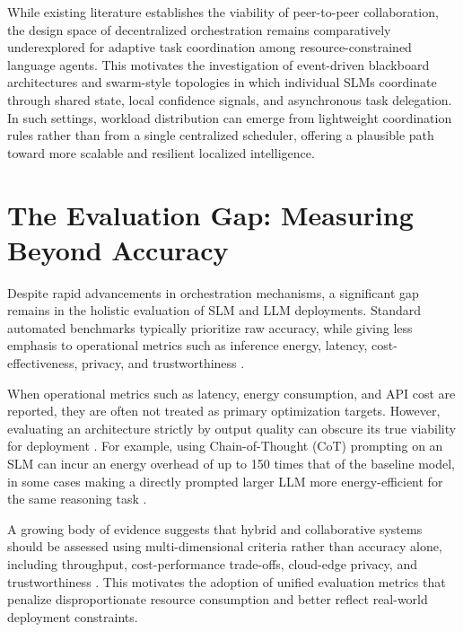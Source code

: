 While existing literature establishes the viability of peer-to-peer collaboration, the design space of decentralized orchestration remains comparatively underexplored for adaptive task coordination among resource-constrained language agents. This motivates the investigation of event-driven blackboard architectures and swarm-style topologies in which individual SLMs coordinate through shared state, local confidence signals, and asynchronous task delegation. In such settings, workload distribution can emerge from lightweight coordination rules rather than from a single centralized scheduler, offering a plausible path toward more scalable and resilient localized intelligence.

\section{The Evaluation Gap: Measuring Beyond Accuracy}
Despite rapid advancements in orchestration mechanisms, a significant gap remains in the holistic evaluation of SLM and LLM deployments. Standard automated benchmarks typically prioritize raw accuracy, while giving less emphasis to operational metrics such as inference energy, latency, cost-effectiveness, privacy, and trustworthiness \cite{wang2025collabperf, energytoken2025}.

When operational metrics such as latency, energy consumption, and API cost are reported, they are often not treated as primary optimization targets. However, evaluating an architecture strictly by output quality can obscure its true viability for deployment \cite{energytoken2025}. For example, using Chain-of-Thought (CoT) prompting on an SLM can incur an energy overhead of up to 150 times that of the baseline model, in some cases making a directly prompted larger LLM more energy-efficient for the same reasoning task \cite{energytoken2025}.

A growing body of evidence suggests that hybrid and collaborative systems should be assessed using multi-dimensional criteria rather than accuracy alone, including throughput, cost-performance trade-offs, cloud-edge privacy, and trustworthiness \cite{wang2025collabperf}. This motivates the adoption of unified evaluation metrics that penalize disproportionate resource consumption and better reflect real-world deployment constraints.